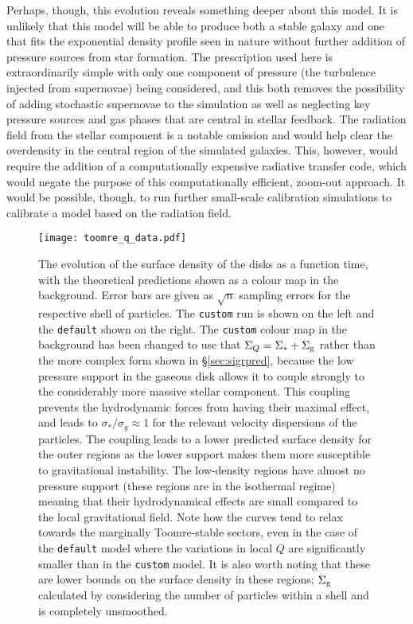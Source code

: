 Perhaps, though, this evolution reveals something deeper about this model.
It is unlikely that this model will be able to produce both a stable galaxy and one that fits the exponential density profile seen in nature without further addition of pressure sources from star formation.
The prescription used here is extraordinarily simple with only one component of pressure (the turbulence injected from supernovae) being considered, and this both removes the possibility of adding stochastic supernovae to the simulation as well as neglecting key pressure sources and gas phases that are central in stellar feedback.
The radiation field from the stellar component is a notable omission and would help clear the overdensity in the central region of the simulated galaxies.
This, however, would require the addition of a computationally expensive radiative transfer code, which would negate the purpose of this computationally efficient, zoom-out approach.
It would be possible, though, to run further small-scale calibration simulations to calibrate a model based on the radiation field.


\begin{figure}
    \centering
    \texttt{[image: toomre\_q\_data.pdf]}
    \caption{The evolution of the surface density of the disks as a function time, with the theoretical predictions shown as a colour map in the background. Error bars are given as $\sqrt{n}$ sampling errors for the respective shell of particles. The {\tt custom} run is shown on the left and the {\tt default} shown on the right. The {\tt custom} colour map in the background has been changed to use that $\Sigma_Q = \Sigma_* + \Sigma_\mathrm{g}$ rather than the more complex form shown in \S \ref{sec:sigrpred}, because the low pressure support in the gaseous disk allows it to couple strongly to the considerably more massive stellar component. This coupling prevents the hydrodynamic forces from having their maximal effect, and leads to $\sigma_*/\sigma_g \approx 1$ for the relevant velocity dispersions of the particles. The coupling leads to a lower predicted surface density for the outer regions as the lower support makes them more susceptible to gravitational instability. The low-density regions have almost no pressure support (these regions are in the isothermal regime) meaning that their hydrodynamical effects are small compared to the local gravitational field. Note how the curves tend to relax towards the marginally Toomre-stable sectors, even in the case of the {\tt default} model where the variations in local $Q$ are significantly smaller than in the {\tt custom} model. It is also worth noting that these are lower bounds on the surface density in these regions; $\Sigma_\mathrm{g}$ calculated by considering the number of particles within a shell and is completely unsmoothed.}
    \label{fig:toomreqthr_dat}
\end{figure}

